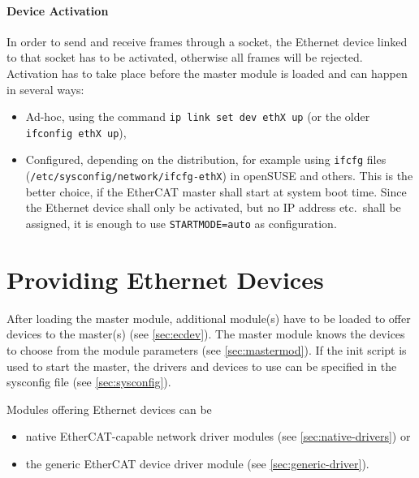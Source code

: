 \documentclass[a4paper,12pt,BCOR=6mm,bibtotoc,idxtotoc]{scrbook}
\begin{document}
\paragraph{Device Activation} In order to send and receive frames through a
socket, the Ethernet device linked to that socket has to be activated,
otherwise all frames will be rejected. Activation has to take place before the
master module is loaded and can happen in several ways:

\begin{itemize}

\item Ad-hoc, using the command \lstinline+ip link set dev ethX up+ (or the
older \lstinline+ifconfig ethX up+),

\item Configured, depending on the distribution, for example using
\lstinline+ifcfg+ files (\lstinline+/etc/sysconfig/network/ifcfg-ethX+) in
openSUSE and others. This is the better choice, if the EtherCAT master shall
start at system boot time. Since the Ethernet device shall only be activated,
but no IP address etc.\ shall be assigned, it is enough to use
\lstinline+STARTMODE=auto+ as configuration.

\end{itemize}


\section{Providing Ethernet Devices}
\label{sec:providing-devices}

After loading the master module, additional module(s) have to be loaded to
offer devices to the master(s) (see \autoref{sec:ecdev}). The master module
knows the devices to choose from the module parameters (see
\autoref{sec:mastermod}). If the init script is used to start the master, the
drivers and devices to use can be specified in the sysconfig file (see
\autoref{sec:sysconfig}).

Modules offering Ethernet devices can be

\begin{itemize}
\item native EtherCAT-capable network driver modules (see
\autoref{sec:native-drivers}) or
\item the generic EtherCAT device driver module (see
\autoref{sec:generic-driver}).
\end{itemize}
\end{document}
